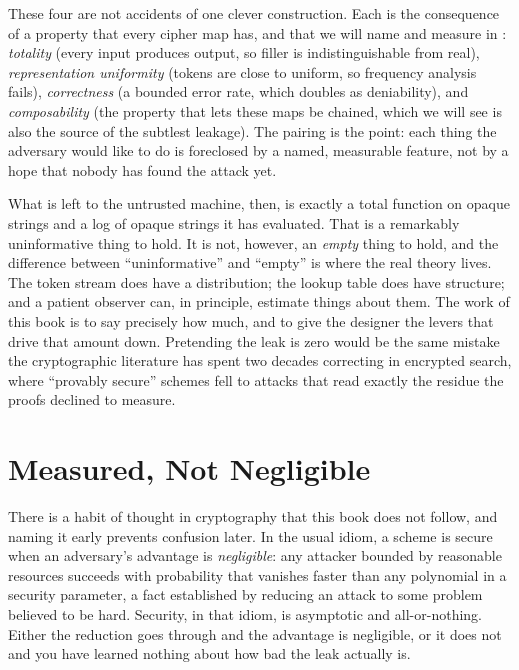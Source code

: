 These four are not accidents of one clever construction. Each is the
consequence of a property that every cipher map has, and that we will name
and measure in : \emph{totality} (every input
produces output, so filler is indistinguishable from real),
\emph{representation uniformity} (tokens are close to uniform, so frequency
analysis fails), \emph{correctness} (a bounded error rate, which doubles as
deniability), and \emph{composability} (the property that lets these maps
be chained, which we will see is also the source of the subtlest leakage).
The pairing is the point: each thing the adversary would like to do is
foreclosed by a named, measurable feature, not by a hope that nobody has
found the attack yet.

What is left to the untrusted machine, then, is exactly a total function on
opaque strings and a log of opaque strings it has evaluated. That is a
remarkably uninformative thing to hold. It is not, however, an
\emph{empty} thing to hold, and the difference between ``uninformative''
and ``empty'' is where the real theory lives. The token stream does have a
distribution; the lookup table does have structure; and a patient observer
can, in principle, estimate things about them. The work of this book is to
say precisely how much, and to give the designer the levers that drive that
amount down. Pretending the leak is zero would be the same mistake the
cryptographic literature has spent two decades correcting in encrypted
search, where ``provably secure'' schemes fell to attacks that read exactly
the residue the proofs declined to measure.

\section{Measured, Not Negligible}
\label{sec:measured-not-negligible}

There is a habit of thought in cryptography that this book does not follow,
and naming it early prevents confusion later. In the usual idiom, a scheme
is secure when an adversary's advantage is \emph{negligible}: any attacker
bounded by reasonable resources succeeds with probability that vanishes
faster than any polynomial in a security parameter, a fact established by
reducing an attack to some problem believed to be hard. Security, in that
idiom, is asymptotic and all-or-nothing. Either the reduction goes through
and the advantage is negligible, or it does not and you have learned
nothing about how bad the leak actually is.

